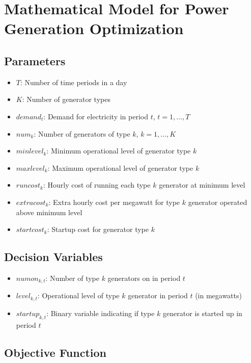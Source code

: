 \documentclass{article}
\begin{document}
\section*{Mathematical Model for Power Generation Optimization}

\subsection*{Parameters}

\begin{itemize}
    \item $T$: Number of time periods in a day
    \item $K$: Number of generator types
    \item $demand_t$: Demand for electricity in period $t$, $t = 1, \ldots, T$
    \item $num_k$: Number of generators of type $k$, $k = 1, \ldots, K$
    \item $minlevel_k$: Minimum operational level of generator type $k$
    \item $maxlevel_k$: Maximum operational level of generator type $k$
    \item $runcost_k$: Hourly cost of running each type $k$ generator at minimum level
    \item $extracost_k$: Extra hourly cost per megawatt for type $k$ generator operated above minimum level
    \item $startcost_k$: Startup cost for generator type $k$
\end{itemize}

\subsection*{Decision Variables}

\begin{itemize}
    \item $numon_{k,t}$: Number of type $k$ generators on in period $t$
    \item $level_{k,t}$: Operational level of type $k$ generator in period $t$ (in megawatts)
    \item $startup_{k,t}$: Binary variable indicating if type $k$ generator is started up in period $t$
\end{itemize}

\subsection*{Objective Function}
\end{document}
